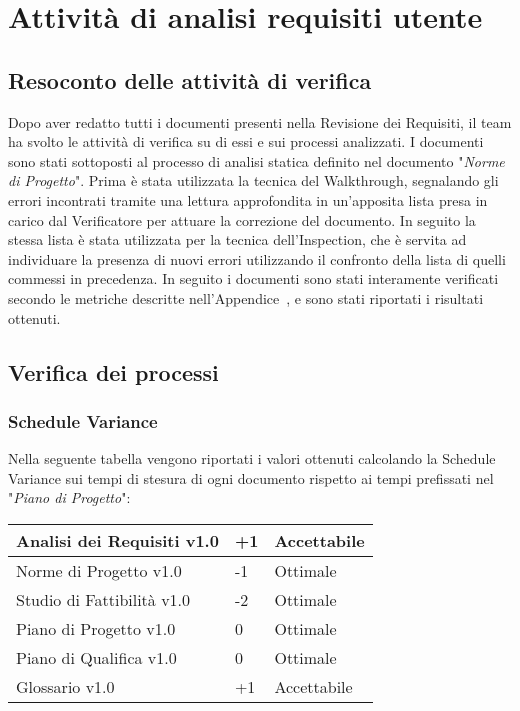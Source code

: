 \newpage
\section{Attività di analisi requisiti utente}
\subsection{Resoconto delle attività di verifica}

Dopo aver redatto tutti i documenti presenti nella Revisione dei Requisiti, il team ha svolto le attività di verifica su di essi e sui processi analizzati. I documenti sono stati sottoposti al processo di analisi statica definito nel documento "\textit{Norme di Progetto}".
Prima è stata utilizzata la tecnica del Walkthrough, segnalando gli errori incontrati tramite una lettura approfondita in un'apposita lista presa in carico dal Verificatore per attuare la correzione del documento. In seguito la stessa lista è stata utilizzata per la tecnica dell'Inspection, che è servita ad individuare la presenza di nuovi errori utilizzando il confronto della lista di quelli commessi in precedenza.
In seguito i documenti sono stati interamente verificati secondo le metriche descritte nell'Appendice~, e sono stati riportati i risultati ottenuti.

\subsection{Verifica dei processi}
\subsubsection{Schedule Variance}
Nella seguente tabella vengono riportati i valori ottenuti calcolando la Schedule Variance sui tempi di stesura di ogni documento rispetto ai tempi prefissati nel "\textit{Piano di Progetto}":

{
	\renewcommand{\arraystretch}{2}
	\centering
	\begin{tabular}{| L{4cm} | R{0.5cm} | C{3cm} |}
	\hline
	Analisi dei Requisiti v1.0 & +1 & Accettabile \\
	\hline
	Norme di Progetto v1.0 & -1 & Ottimale \\
	\hline
	Studio di Fattibilità v1.0 &  -2 &  Ottimale \\
	\hline
	Piano di Progetto v1.0 &  0 &  Ottimale\\
	\hline
	Piano di Qualifica v1.0 & 0 & Ottimale \\
	\hline
	Glossario v1.0 & +1 & Accettabile\\	
	\hline
	\end{tabular}
	
}

